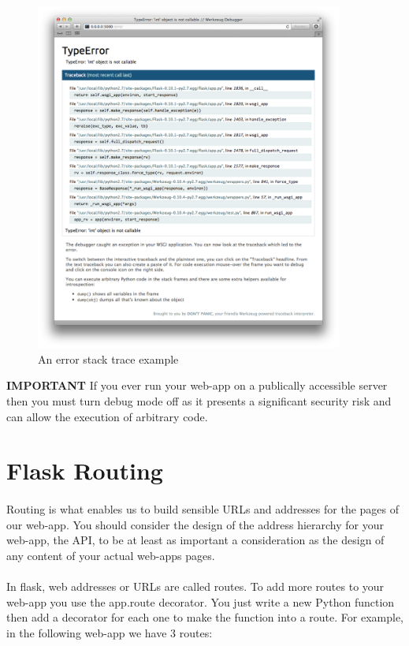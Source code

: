 \documentclass[12pt, a4paper, twoside]{book}
\begin{document}
\begin{figure}[H]
\centering
\includegraphics[width=0.9\textwidth]{images/flask-stack-trace.png}
\caption{An error stack trace example}
\label{fig:flask-stack-trace}
\end{figure}


\begin{framed}
\textbf{IMPORTANT} If you ever run your web-app on a publically accessible server then you must turn debug mode off as it presents a significant security risk and can allow the execution of arbitrary code.
\end{framed}

\section{Flask Routing}
\label{routing}
\paragraph{} Routing is what enables us to build sensible URLs and addresses for the pages of our web-app. You should consider the design of the address hierarchy for your web-app, the API, to be at least as important a consideration as the design of any content of your actual web-apps pages.

\paragraph{} In flask, web addresses or URLs are called routes. To add more routes to your web-app you use the app.route decorator. You just write a new Python function then add a decorator for each one to make the function into a route. For example, in the following web-app we have 3 routes:
\end{document}
